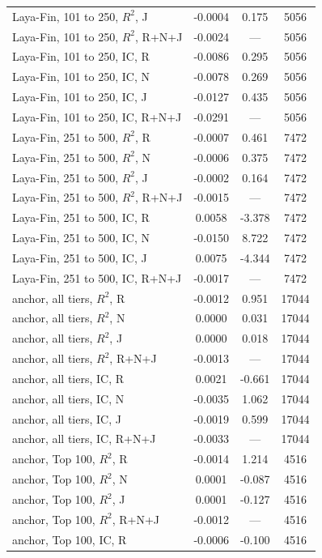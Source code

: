 \begin{longtable}{@{}lS[table-format=-1.4]S[table-format=-1.3]S[table-format=5.0]@{}}
Laya-Fin, 101 to 250, $R^2$, J & -0.0004 & 0.175 & 5056 \\
Laya-Fin, 101 to 250, $R^2$, R+N+J & -0.0024 & {---} & 5056 \\
Laya-Fin, 101 to 250, IC, R & -0.0086 & 0.295 & 5056 \\
Laya-Fin, 101 to 250, IC, N & -0.0078 & 0.269 & 5056 \\
Laya-Fin, 101 to 250, IC, J & -0.0127 & 0.435 & 5056 \\
Laya-Fin, 101 to 250, IC, R+N+J & -0.0291 & {---} & 5056 \\
Laya-Fin, 251 to 500, $R^2$, R & -0.0007 & 0.461 & 7472 \\
Laya-Fin, 251 to 500, $R^2$, N & -0.0006 & 0.375 & 7472 \\
Laya-Fin, 251 to 500, $R^2$, J & -0.0002 & 0.164 & 7472 \\
Laya-Fin, 251 to 500, $R^2$, R+N+J & -0.0015 & {---} & 7472 \\
Laya-Fin, 251 to 500, IC, R & 0.0058 & -3.378 & 7472 \\
Laya-Fin, 251 to 500, IC, N & -0.0150 & 8.722 & 7472 \\
Laya-Fin, 251 to 500, IC, J & 0.0075 & -4.344 & 7472 \\
Laya-Fin, 251 to 500, IC, R+N+J & -0.0017 & {---} & 7472 \\
anchor, all tiers, $R^2$, R & -0.0012 & 0.951 & 17044 \\
anchor, all tiers, $R^2$, N & 0.0000 & 0.031 & 17044 \\
anchor, all tiers, $R^2$, J & 0.0000 & 0.018 & 17044 \\
anchor, all tiers, $R^2$, R+N+J & -0.0013 & {---} & 17044 \\
anchor, all tiers, IC, R & 0.0021 & -0.661 & 17044 \\
anchor, all tiers, IC, N & -0.0035 & 1.062 & 17044 \\
anchor, all tiers, IC, J & -0.0019 & 0.599 & 17044 \\
anchor, all tiers, IC, R+N+J & -0.0033 & {---} & 17044 \\
anchor, Top 100, $R^2$, R & -0.0014 & 1.214 & 4516 \\
anchor, Top 100, $R^2$, N & 0.0001 & -0.087 & 4516 \\
anchor, Top 100, $R^2$, J & 0.0001 & -0.127 & 4516 \\
anchor, Top 100, $R^2$, R+N+J & -0.0012 & {---} & 4516 \\
anchor, Top 100, IC, R & -0.0006 & -0.100 & 4516 \\

\end{longtable}
